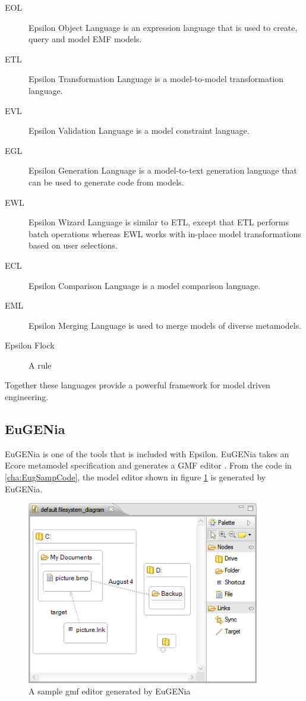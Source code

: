 \begin{description}
\item[EOL] Epsilon Object Language is an expression language that is used to create, query and model EMF models.
\item[ETL] Epsilon Transformation Language is a model-to-model transformation language.
\item[EVL] Epsilon Validation Language is a model constraint language.
\item[EGL] Epsilon Generation Language is a model-to-text generation language that can be used to generate code from models.
\item[EWL] Epsilon Wizard Language is similar to ETL, except that ETL performs batch operations whereas EWL works with in-place model transformations based on user selections.
\item[ECL] Epsilon Comparison Language is a model comparison language.
\item[EML] Epsilon Merging Language is used to merge models of diverse metamodels.
\item[Epsilon Flock] A rule
\end{description}

Together these languages provide a powerful framework for model driven engineering.

\subsection{EuGENia}
EuGENia is one of the tools that is included with Epsilon. EuGENia takes an Ecore metamodel specification and generates a GMF editor \citep{eugeniaSite}. From the code in \ref{cha:EugSampCode}, the model editor shown in figure \ref{sampleGmf} is generated by EuGENia.

\begin{figure}
\begin{center}
	\includegraphics[width=4in]{figures/gmfeditor.png}
\end{center}
\caption{A sample gmf editor generated by EuGENia \citep{eugeniaSite}}
\label{sampleGmf}
\end{figure}


